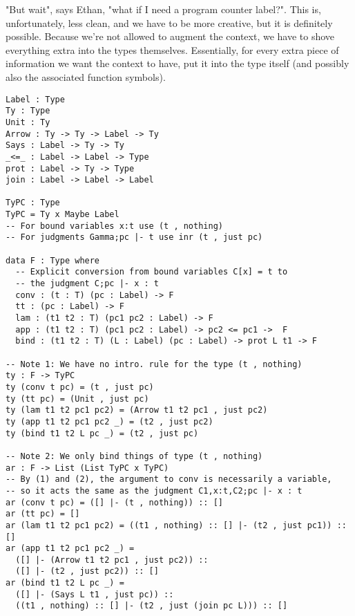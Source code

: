 \documentclass{article}
\theoremstyle{definition}
\begin{document}
"But wait", says Ethan, "what if I need a program counter label?". This is, unfortunately, less clean, and we have to be more creative, but it is definitely possible. Because we're not allowed to augment the context, we have to shove everything extra into the types themselves. Essentially, for every extra piece of information we want the context to have, put it into the type itself (and possibly also the associated function symbols).
\begin{verbatim}		
Label : Type
Ty : Type
Unit : Ty
Arrow : Ty -> Ty -> Label -> Ty
Says : Label -> Ty -> Ty
_<=_ : Label -> Label -> Type
prot : Label -> Ty -> Type
join : Label -> Label -> Label

TyPC : Type
TyPC = Ty x Maybe Label
-- For bound variables x:t use (t , nothing)
-- For judgments Gamma;pc |- t use inr (t , just pc)

data F : Type where
  -- Explicit conversion from bound variables C[x] = t to
  -- the judgment C;pc |- x : t
  conv : (t : T) (pc : Label) -> F
  tt : (pc : Label) -> F
  lam : (t1 t2 : T) (pc1 pc2 : Label) -> F
  app : (t1 t2 : T) (pc1 pc2 : Label) -> pc2 <= pc1 ->  F
  bind : (t1 t2 : T) (L : Label) (pc : Label) -> prot L t1 -> F

-- Note 1: We have no intro. rule for the type (t , nothing)
ty : F -> TyPC
ty (conv t pc) = (t , just pc)
ty (tt pc) = (Unit , just pc)
ty (lam t1 t2 pc1 pc2) = (Arrow t1 t2 pc1 , just pc2)
ty (app t1 t2 pc1 pc2 _) = (t2 , just pc2)
ty (bind t1 t2 L pc _) = (t2 , just pc)

-- Note 2: We only bind things of type (t , nothing)
ar : F -> List (List TyPC x TyPC)
-- By (1) and (2), the argument to conv is necessarily a variable,
-- so it acts the same as the judgment C1,x:t,C2;pc |- x : t
ar (conv t pc) = ([] |- (t , nothing)) :: []
ar (tt pc) = []
ar (lam t1 t2 pc1 pc2) = ((t1 , nothing) :: [] |- (t2 , just pc1)) :: []
ar (app t1 t2 pc1 pc2 _) =
  ([] |- (Arrow t1 t2 pc1 , just pc2)) ::
  ([] |- (t2 , just pc2)) :: []
ar (bind t1 t2 L pc _) =
  ([] |- (Says L t1 , just pc)) ::
  ((t1 , nothing) :: [] |- (t2 , just (join pc L))) :: []
\end{verbatim}
\end{document}
